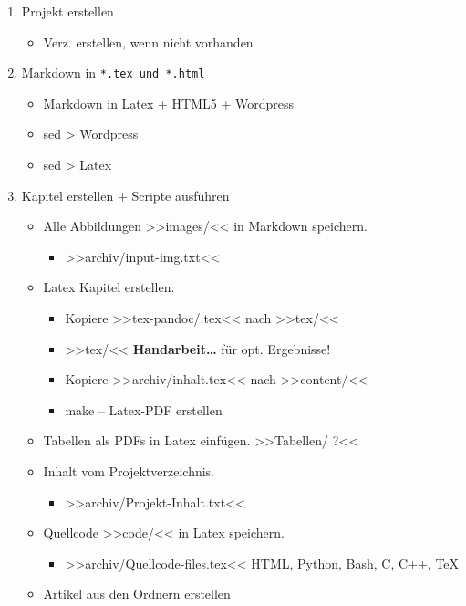 \begin{enumerate}
\item
  Projekt erstellen

  \begin{itemize}
  \item
    Verz. erstellen, wenn nicht vorhanden
  \end{itemize}
\item
  Markdown in \verb|*.tex und *.html|

  \begin{itemize}
  \item
    Markdown in Latex + HTML5 + Wordpress
  \item
    sed > Wordpress
  \item
    sed > Latex
  \end{itemize}
\item
  Kapitel erstellen + Scripte ausführen

  \begin{itemize}
  \item
    Alle Abbildungen >>images/<< in Markdown speichern.

    \begin{itemize}
    \item
      >>archiv/input-img.txt<<
    \end{itemize}
  \item
    Latex Kapitel erstellen.

    \begin{itemize}
    \item
      Kopiere >>tex-pandoc/.tex<< nach >>tex/<<
    \item
      >>tex/<< \textbf{Handarbeit\ldots{}} für opt. Ergebnisse!
    \item
      Kopiere >>archiv/inhalt.tex<< nach >>content/<<
    \item
      make -- Latex-PDF erstellen
    \end{itemize}
  \item
    Tabellen als PDFs in Latex einfügen. >>Tabellen/ ?<<
  \item
    Inhalt vom Projektverzeichnis.

    \begin{itemize}
    \item
      >>archiv/Projekt-Inhalt.txt<<
    \end{itemize}
  \item
    Quellcode >>code/<< in Latex speichern.

    \begin{itemize}
    \item
      >>archiv/Quellcode-files.tex<< HTML, Python, Bash, C, C++, TeX
    \end{itemize}
  \item
    Artikel aus den Ordnern erstellen


\end{itemize}
\end{enumerate}
